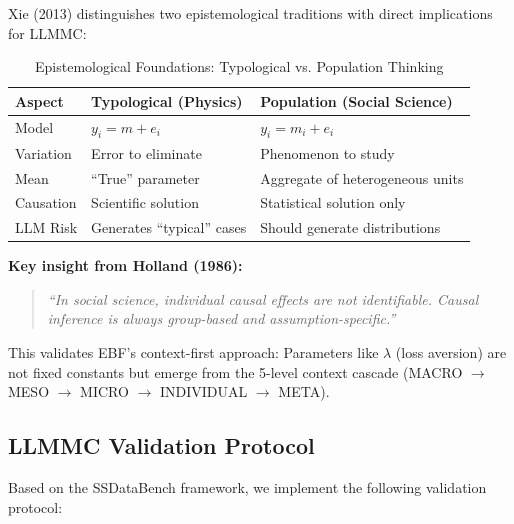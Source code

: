 Xie (2013) distinguishes two epistemological traditions with direct implications for LLMMC:

\begin{table}[h]
\centering
\caption{Epistemological Foundations: Typological vs. Population Thinking}
\label{tab:epistemology}
\begin{tabular}{lll}
\toprule
\textbf{Aspect} & \textbf{Typological (Physics)} & \textbf{Population (Social Science)} \\
\midrule
Model & $y_i = m + e_i$ & $y_i = m_i + e_i$ \\
Variation & Error to eliminate & Phenomenon to study \\
Mean & ``True'' parameter & Aggregate of heterogeneous units \\
Causation & Scientific solution & Statistical solution only \\
LLM Risk & Generates ``typical'' cases & Should generate distributions \\
\bottomrule
\end{tabular}
\end{table}

\textbf{Key insight from Holland (1986):}
\begin{quote}
\emph{``In social science, individual causal effects are not identifiable.
Causal inference is always group-based and assumption-specific.''}
\end{quote}

This validates EBF's context-first approach: Parameters like $\lambda$ (loss aversion)
are not fixed constants but emerge from the 5-level context cascade
(MACRO $\to$ MESO $\to$ MICRO $\to$ INDIVIDUAL $\to$ META).

\subsection{LLMMC Validation Protocol}

Based on the SSDataBench framework, we implement the following validation protocol:

